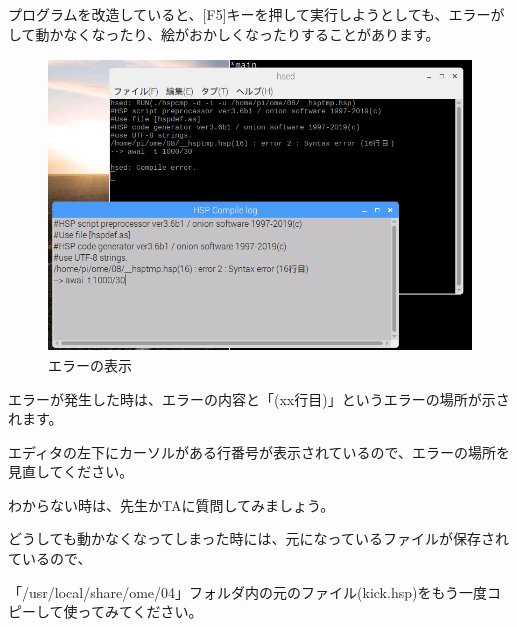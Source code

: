 \begin{description}
    \item {}
\end{description}

プログラムを改造していると、[F5]キーを押して実行しようとしても、エラーがして動かなくなったり、絵がおかしくなったりすることがあります。


\begin{figure}[H]
    \begin{center}
      \includegraphics[keepaspectratio,width=11.324cm,height=7.756cm]{text04-img/s_hsperror.png}
      \caption{エラーの表示}
    \end{center}
    \label{fig:prog_menu}
\end{figure}

エラーが発生した時は、エラーの内容と「(xx行目)」というエラーの場所が示されます。

エディタの左下にカーソルがある行番号が表示されているので、エラーの場所を見直してください。

わからない時は、先生かTAに質問してみましょう。

どうしても動かなくなってしまった時には、元になっているファイルが保存されているので、

「/usr/local/share/ome/04」フォルダ内の元のファイル(kick.hsp)をもう一度コピーして使ってみてください。